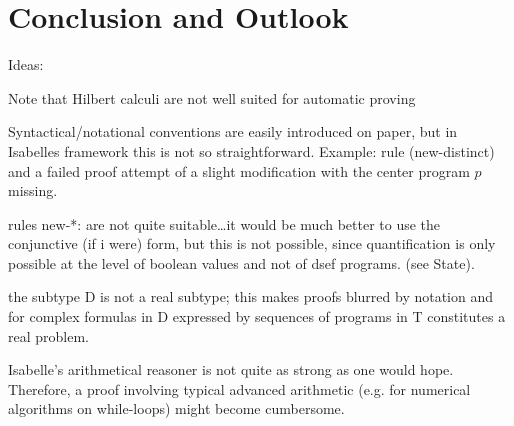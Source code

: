 
\chapter{Conclusion and Outlook}
\label{cha:outlook}


Ideas:

Note that Hilbert calculi are not well suited for automatic proving

Syntactical/notational conventions are easily introduced on paper, but in
Isabelles framework this is not so straightforward. Example: rule (new-distinct)
and a failed proof attempt of a slight modification with the center program $p$
missing.

rules new-*: are not quite suitable\ldots it would be much better to use the
conjunctive (if i were) form, but this is not possible, since quantification is
only possible at the level of boolean values and not of dsef programs. (see State).

the subtype D is not a real subtype; this makes proofs blurred by notation and
for complex formulas in D expressed by sequences of programs in T constitutes a
real problem.


Isabelle's arithmetical reasoner is not quite as strong as one would
hope. Therefore, a proof involving typical advanced arithmetic (e.g. for
numerical algorithms on while-loops) might become cumbersome.


